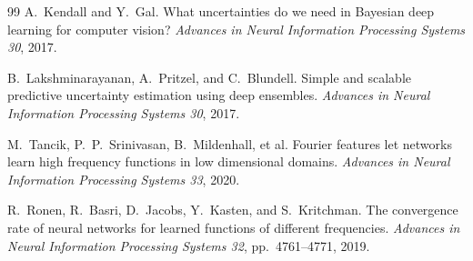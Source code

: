 \documentclass[9pt,twocolumn]{article}
\theoremstyle{remark}
\theoremstyle{definition}
\begin{document}
\begin{thebibliography}{99}
A.~Kendall and Y.~Gal.
\newblock What uncertainties do we need in Bayesian deep learning for computer vision?
\newblock \textit{Advances in Neural Information Processing Systems 30}, 2017.

B.~Lakshminarayanan, A.~Pritzel, and C.~Blundell.
\newblock Simple and scalable predictive uncertainty estimation using deep ensembles.
\newblock \textit{Advances in Neural Information Processing Systems 30}, 2017.

M.~Tancik, P.~P.~Srinivasan, B.~Mildenhall, et al.
\newblock Fourier features let networks learn high frequency functions in low dimensional domains.
\newblock \textit{Advances in Neural Information Processing Systems 33}, 2020.

R.~Ronen, R.~Basri, D.~Jacobs, Y.~Kasten, and S.~Kritchman.
\newblock The convergence rate of neural networks for learned functions of different frequencies.
\newblock \textit{Advances in Neural Information Processing Systems 32}, pp.~4761--4771, 2019.

\end{thebibliography}

\endgroup
\end{document}
